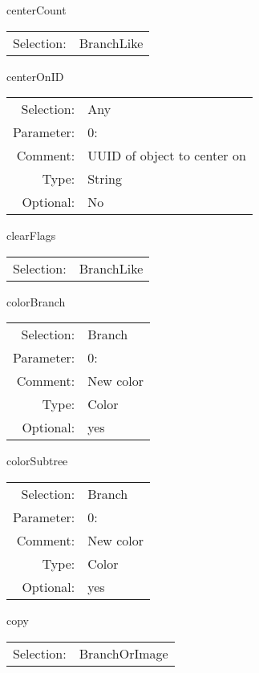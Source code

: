 \item centerCount\\
\begin{tabular}{rl}
  Selection: & BranchLike\\
\end{tabular}

\item centerOnID\\
\begin{tabular}{rl}
  Selection: & Any\\
   Parameter: &  0:\\
        Comment: & UUID of object to center on\\
           Type: & String\\
       Optional: &  No\\
\end{tabular}

\item clearFlags\\
\begin{tabular}{rl}
  Selection: & BranchLike\\
\end{tabular}

\item colorBranch\\
\begin{tabular}{rl}
  Selection: & Branch\\
   Parameter: &  0:\\
        Comment: & New color\\
           Type: & Color\\
       Optional: &  yes\\
\end{tabular}

\item colorSubtree\\
\begin{tabular}{rl}
  Selection: & Branch\\
   Parameter: &  0:\\
        Comment: & New color\\
           Type: & Color\\
       Optional: &  yes\\
\end{tabular}

\item copy\\
\begin{tabular}{rl}
  Selection: & BranchOrImage\\
\end{tabular}

